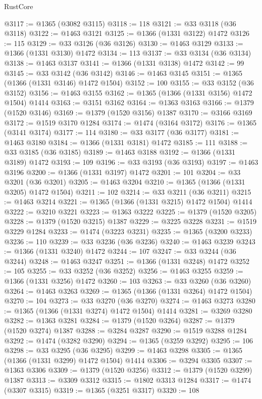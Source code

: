 \begin{lexlean}{RustCore}
\begin{coremodule}
@3117 := @1365 (@3082 @3115)
@3118 := 118
@3121 := @33 @3118 (@36 @3118)
@3122 := @1463 @3121
@3125 := @1366 (@1331 @3122) @1472
@3126 := 115
@3129 := @33 @3126 (@36 @3126)
@3130 := @1463 @3129
@3133 := @1366 (@1331 @3130) @1472
@3134 := 113
@3137 := @33 @3134 (@36 @3134)
@3138 := @1463 @3137
@3141 := @1366 (@1331 @3138) @1472
@3142 := 99
@3145 := @33 @3142 (@36 @3142)
@3146 := @1463 @3145
@3151 := @1365 (@1366 (@1331 @3146) @1472 @1504)
@3152 := 100
@3155 := @33 @3152 (@36 @3152)
@3156 := @1463 @3155
@3162 := @1365 (@1366 (@1331 @3156) @1472 @1504) @1414
@3163 := @3151 @3162
@3164 := @1363 @3163
@3166 := @1379 (@1520 @3146)
@3169 := @1379 (@1520 @3156) @1387
@3170 := @3166 @3169
@3172 := @1519 @3170 @1284
@3174 := @1474 (@3164 @3172)
@3176 := @1365 (@3141 @3174)
@3177 := 114
@3180 := @33 @3177 (@36 @3177)
@3181 := @1463 @3180
@3184 := @1366 (@1331 @3181) @1472
@3185 := 111
@3188 := @33 @3185 (@36 @3185)
@3189 := @1463 @3188
@3192 := @1366 (@1331 @3189) @1472
@3193 := 109
@3196 := @33 @3193 (@36 @3193)
@3197 := @1463 @3196
@3200 := @1366 (@1331 @3197) @1472
@3201 := 101
@3204 := @33 @3201 (@36 @3201)
@3205 := @1463 @3204
@3210 := @1365 (@1366 (@1331 @3205) @1472 @1504)
@3211 := 102
@3214 := @33 @3211 (@36 @3211)
@3215 := @1463 @3214
@3221 := @1365 (@1366 (@1331 @3215) @1472 @1504) @1414
@3222 := @3210 @3221
@3223 := @1363 @3222
@3225 := @1379 (@1520 @3205)
@3228 := @1379 (@1520 @3215) @1387
@3229 := @3225 @3228
@3231 := @1519 @3229 @1284
@3233 := @1474 (@3223 @3231)
@3235 := @1365 (@3200 @3233)
@3236 := 110
@3239 := @33 @3236 (@36 @3236)
@3240 := @1463 @3239
@3243 := @1366 (@1331 @3240) @1472
@3244 := 107
@3247 := @33 @3244 (@36 @3244)
@3248 := @1463 @3247
@3251 := @1366 (@1331 @3248) @1472
@3252 := 105
@3255 := @33 @3252 (@36 @3252)
@3256 := @1463 @3255
@3259 := @1366 (@1331 @3256) @1472
@3260 := 103
@3263 := @33 @3260 (@36 @3260)
@3264 := @1463 @3263
@3269 := @1365 (@1366 (@1331 @3264) @1472 @1504)
@3270 := 104
@3273 := @33 @3270 (@36 @3270)
@3274 := @1463 @3273
@3280 := @1365 (@1366 (@1331 @3274) @1472 @1504) @1414
@3281 := @3269 @3280
@3282 := @1363 @3281
@3284 := @1379 (@1520 @3264)
@3287 := @1379 (@1520 @3274) @1387
@3288 := @3284 @3287
@3290 := @1519 @3288 @1284
@3292 := @1474 (@3282 @3290)
@3294 := @1365 (@3259 @3292)
@3295 := 106
@3298 := @33 @3295 (@36 @3295)
@3299 := @1463 @3298
@3305 := @1365 (@1366 (@1331 @3299) @1472 @1504) @1414
@3306 := @3294 @3305
@3307 := @1363 @3306
@3309 := @1379 (@1520 @3256)
@3312 := @1379 (@1520 @3299) @1387
@3313 := @3309 @3312
@3315 := @1802 @3313 @1284
@3317 := @1474 (@3307 @3315)
@3319 := @1365 (@3251 @3317)
@3320 := 108

\end{coremodule}
\end{lexlean}
